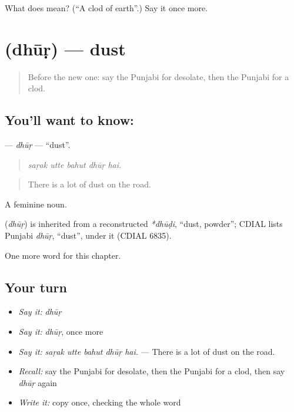\begin{tcolorbox}[breakable,colback=teal!4,colframe=teal!35!black,title={Before you move on}]
What does  mean? (\textquotedblleft{}A clod of earth\textquotedblright{}.) Say it once more.
\end{tcolorbox}
\section[\texorpdfstring{\pa{ਧੂੜ} (dhūṛ)}{ਧੂੜ (dhūṛ)}]{ (dhūṛ) — dust}

\label{lesson:PA-C294-dhur}



\begin{quote}
Before the new one: say the Punjabi for desolate, then the Punjabi for a clod.
\end{quote}

\subsection*{You'll want to know: }
\textbf{} — \emph{dhūṛ} — \textquotedblleft{}dust\textquotedblright{}.

\begin{quote}
    
\end{quote}

\begin{quote}
\emph{saṛak utte bahut dhūṛ hai.}
\end{quote}

\begin{quote}
There is a lot of dust on the road.
\end{quote}

A feminine noun.

\begin{cousinweb}
\textbf{} (\emph{dhūṛ}) is inherited from a reconstructed \emph{*dhūḍi}, \textquotedblleft{}dust, powder\textquotedblright{}; CDIAL lists Punjabi \emph{dhūṛ}, \textquotedblleft{}dust\textquotedblright{}, under it (CDIAL 6835).
\end{cousinweb}

\begin{grammarlens}[title={What you've built}]
One more word for this chapter.
\end{grammarlens}

\subsection*{Your turn}
\begin{itemize}
\raggedright
  \item \emph{Say it:} \emph{dhūṛ}
  \item \emph{Say it:} \emph{dhūṛ}, once more
  \item \emph{Say it:} \emph{saṛak utte bahut dhūṛ hai.} — There is a lot of dust on the road.
  \item \emph{Recall:} say the Punjabi for desolate, then the Punjabi for a clod, then say \emph{dhūṛ} again
  \item \emph{Write it:} copy \textbf{} once, checking the whole word
\end{itemize}

